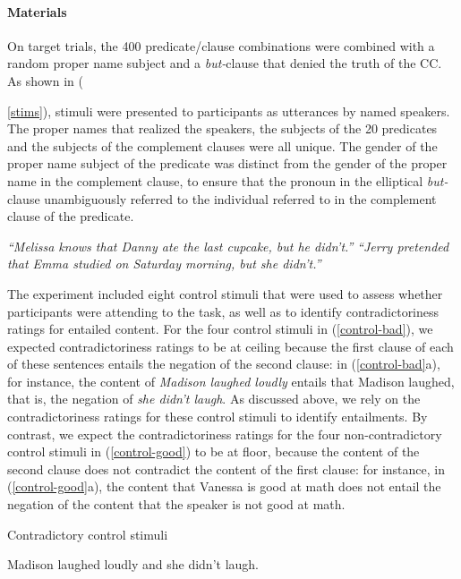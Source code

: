 \documentclass[11pt,fleqn]{article}
\newcommand{\6}{\mbox{$[\hspace*{-.6mm}[$}}
\newcommand{\9}{\mbox{$]\hspace*{-.6mm}]$}}
\begin{document}
\paragraph{Materials} On target trials, the 400 predicate/clause combinations were combined with a random proper name subject and a {\em but-}clause that denied the truth of the CC. As shown in ({\ref{stims}), stimuli were presented to participants as utterances by named speakers. The proper names that realized the speakers, the subjects of the 20 predicates and the subjects of the complement clauses were all unique. The gender of the proper name subject of the predicate was distinct from the gender of the proper name in the complement clause, to ensure that the pronoun in the elliptical {\em but-}clause unambiguously referred to the individual referred to in the complement clause of the predicate.

\begin{exe}
\ex\label{stims}
\begin{xlist}
 {\em ``Melissa knows that Danny ate the last cupcake, but he didn't.''}
 {\em ``Jerry pretended that Emma studied on Saturday morning, but she didn't.''}
\end{xlist}
\end{exe}

The experiment  included eight control stimuli that were used to assess whether participants were attending to the task, as well as to identify contradictoriness ratings for entailed content. For the four control stimuli in (\ref{control-bad}), we expected contradictoriness ratings to be at ceiling because the first clause of each of these sentences entails the negation of the second clause: in (\ref{control-bad}a), for instance, the content of {\em Madison laughed loudly} entails that Madison laughed, that is, the negation of {\em she didn't laugh}. As discussed above, we rely on the contradictoriness ratings for these control stimuli to identify entailments. By contrast, we expect the contradictoriness ratings for the four non-contradictory control stimuli in (\ref{control-good}) to be at floor, because the content of the second clause does not contradict the content of the first clause: for instance, in (\ref{control-good}a), the content that Vanessa is good at math does not entail the negation of the content that the speaker is not good at math. 

\begin{exe}

\ex\label{control-bad} Contradictory control stimuli
\begin{xlist}
\ex Madison laughed loudly and she didn't laugh.


\end{xlist}
\end{exe}}
\end{document}
